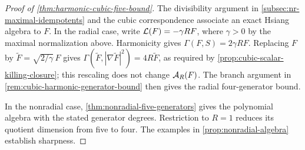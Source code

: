 



\begin{proof}[Proof of \cref{thm:harmonic-cubic-five-bound}]
The divisibility argument in \cref{subsec:nr-maximal-idempotents}
and the cubic correspondence associate an exact Hsiang algebra to $F$.
In the radial case, write $\mathcal L(F)=-\gamma RF$, where $\gamma>0$
by the maximal normalization above. Harmonicity gives
$\Gamma(F,S)=2\gamma RF$. Replacing $F$ by
$\widetilde F=\sqrt{2/\gamma}\,F$ gives
$\Gamma(\widetilde F,|\nabla\widetilde F|^2)=4R\widetilde F$,
as required by \cref{prop:cubic-scalar-killing-closure}; this rescaling
does not change $\mathcal A_R(F)$.
The branch argument in \cref{rem:cubic-harmonic-generator-bound}
then gives the radial four-generator bound.

In the nonradial case, \cref{thm:nonradial-five-generators} gives the
polynomial algebra with the stated generator degrees. Restriction to
$R=1$ reduces its quotient dimension from five to four. The examples
in \cref{prop:nonradial-algebra} establish sharpness.
\end{proof}
